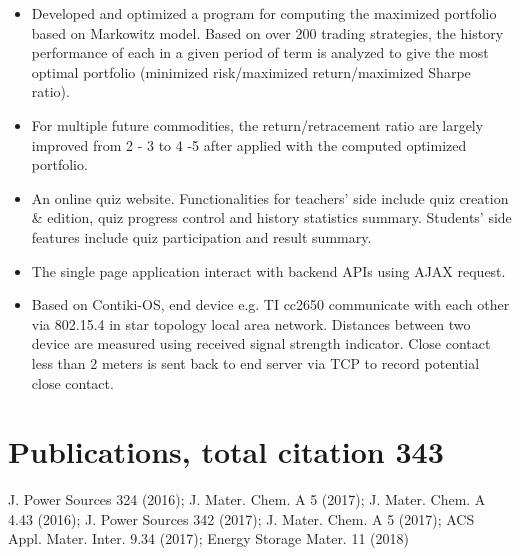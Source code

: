 \documentclass{resume}
\begin{document}
\begin{itemize}
  \item Developed and optimized a program for computing the maximized portfolio based on Markowitz model. Based on over 200 trading strategies, the history performance of each in a given period of term is analyzed to give the most optimal portfolio (minimized risk/maximized return/maximized Sharpe ratio).
  \item For multiple future commodities, the return/retracement ratio are largely improved from 2 - 3 to 4 -5 after applied with the computed optimized portfolio.
\end{itemize}


\begin{itemize}
  \item An online quiz website. Functionalities for teachers' side include quiz creation \& edition, quiz progress control and history statistics summary. Students' side features include quiz participation and result summary.
  \item The single page application interact with backend APIs using AJAX request. 
\end{itemize}

\begin{itemize}
  \item Based on Contiki-OS, end device e.g. TI cc2650 communicate with each other via 802.15.4 in star topology local area network. Distances between two device are measured using received signal strength indicator. Close contact less than 2 meters is sent back to end server via TCP to record potential close contact.
\end{itemize}

\section{Publications, total citation 343}
  J. Power Sources 324 (2016); J. Mater. Chem. A 5 (2017); J. Mater. Chem. A 4.43
  (2016); J. Power Sources 342 (2017); J. Mater. Chem. A 5 (2017); ACS
  Appl. Mater. Inter. 9.34 (2017); Energy Storage Mater. 11 (2018)
\end{document}
